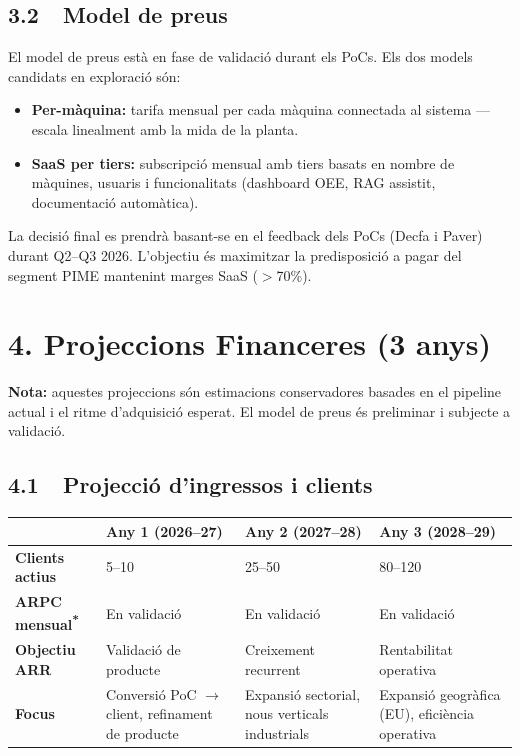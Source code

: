 \documentclass[11pt,a4paper]{article}
\begin{document}
\subsection{3.2~~Model de preus}

El model de preus està en fase de validació durant els PoCs. Els dos models candidats en exploració són:

\begin{itemize}[leftmargin=1.5em,itemsep=2pt]
\item \textbf{Per-màquina:} tarifa mensual per cada màquina connectada al sistema --- escala linealment amb la mida de la planta.
\item \textbf{SaaS per tiers:} subscripció mensual amb tiers basats en nombre de màquines, usuaris i funcionalitats (dashboard OEE, RAG assistit, documentació automàtica).
\end{itemize}

La decisió final es prendrà basant-se en el feedback dels PoCs (Decfa i Paver) durant Q2--Q3 2026. L'objectiu és maximitzar la predisposició a pagar del segment PIME mantenint marges SaaS ($>$70\%).

\section{4. Projeccions Financeres (3 anys)}

\begin{keybox}
\small\textbf{Nota:} aquestes projeccions són estimacions conservadores basades en el pipeline actual i el ritme d'adquisició esperat. El model de preus és preliminar i subjecte a validació.
\end{keybox}

\subsection{4.1~~Projecció d'ingressos i clients}

\begin{center}
\renewcommand{\arraystretch}{1.3}
\begin{tabularx}{0.92\textwidth}{l X X X}
\toprule
& \textbf{Any 1 (2026--27)} & \textbf{Any 2 (2027--28)} & \textbf{Any 3 (2028--29)} \\
\midrule
\textbf{Clients actius} & 5--10 & 25--50 & 80--120 \\
\textbf{ARPC mensual\textsuperscript{*}} & En validació & En validació & En validació \\
\textbf{Objectiu ARR} & Validació de producte & Creixement recurrent & Rentabilitat operativa \\
\textbf{Focus} & Conversió PoC $\rightarrow$ client, refinament de producte & Expansió sectorial, nous verticals industrials & Expansió geogràfica (EU), eficiència operativa \\
\bottomrule
\end{tabularx}
\end{center}
\end{document}
